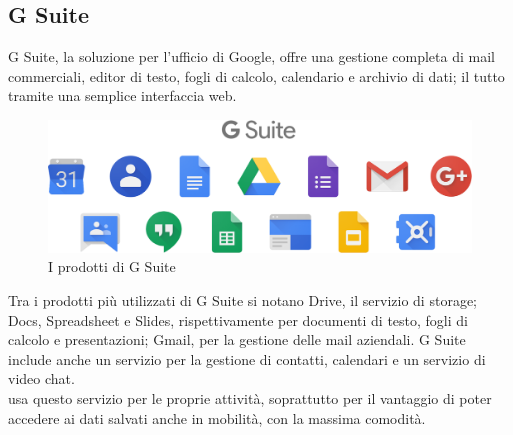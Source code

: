    \subsection{G Suite}
   G Suite, la soluzione per l'ufficio di Google, offre una gestione completa di mail commerciali, editor di testo, fogli di calcolo, calendario e archivio di dati; il tutto tramite una semplice interfaccia web.
   \begin{figure}[H]
      \begin{center}
      \includegraphics[width=16cm,keepaspectratio]{immagini/g-suite-products}
      \end{center}
      \caption{I prodotti di G Suite}
   \end{figure}
   Tra i prodotti più utilizzati di G Suite si notano Drive, il servizio di storage; Docs, Spreadsheet e Slides, rispettivamente per documenti di testo, fogli di calcolo e presentazioni; Gmail, per la gestione delle mail aziendali. G Suite include anche un servizio per la gestione di contatti, calendari e un servizio di video chat.
   \\
   \nomeAzienda{} usa questo servizio per le proprie attività, soprattutto per il vantaggio di poter accedere ai dati salvati anche in mobilità, con la massima comodità.

